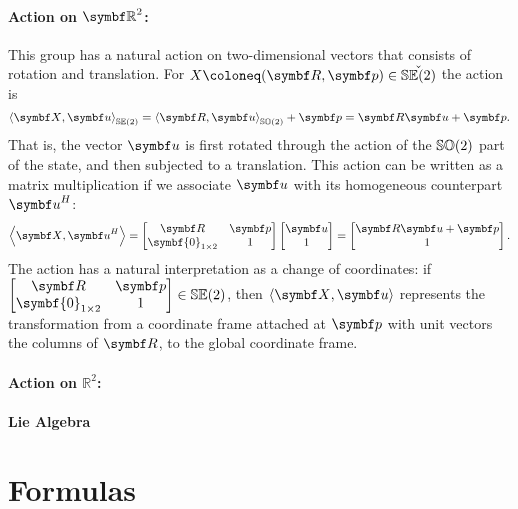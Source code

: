 \paragraph{Action on $\mathbb{\bR}^2$:}
This group has a natural action on two-dimensional vectors that consists of rotation and translation. For $X \coloneq (\bR, \bp) \in \check {\SEtwo}$ the action is
\begin{equation}
  \left \langle \X, \bu \right \rangle_{\SEtwo} = \left \langle \bR, \bu \right \rangle_{\SOtwo} + \bp = \bR \bu + \bp.
\end{equation}
That is, the vector $\bu$ is first rotated through the action of the ${\mathbb{SO}(2)}$ part of the state, and then subjected to a translation. This action can be written as a matrix multiplication if we associate $\bu$ with its homogeneous counterpart $\bu^H$:
\begin{equation}
  \left \langle \X, \bu^H \right \rangle = \begin{bmatrix}
    \bR & \bp \\ \symbf{0}_{1 \times 2} & 1
  \end{bmatrix} \begin{bmatrix}
    \symbf u \\ 1
  \end{bmatrix} = \begin{bmatrix}
    \bR \bu + \bp \\ 1
  \end{bmatrix}.
\end{equation}
The action has a natural interpretation as a change of coordinates: if $\begin{bmatrix} \bR & \bp \\ \symbf{0}_{1 \times 2} & 1 \end{bmatrix} \in \SEtwo$, then $\left \langle \X, \bu \right \rangle$ represents the transformation from a coordinate frame attached at $\bp$ with unit vectors the columns of $\bR$, to the global coordinate frame.

\paragraph{Action on $\mathbb{R}^2$:}

\paragraph{Lie Algebra}


\section{Formulas}

